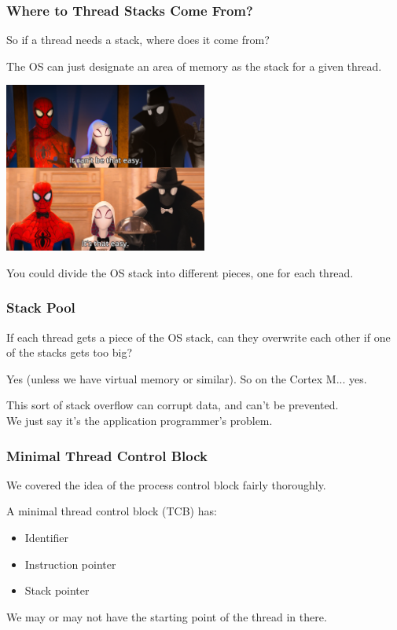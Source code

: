 \begin{frame}
\frametitle{Where to Thread Stacks Come From?}

So if a thread needs a stack, where does it come from?

The OS can just designate an area of memory as the stack for a given thread.

\begin{center}
	\includegraphics[width=0.5\textwidth]{images/thateasy.png}
\end{center}


You could divide the OS stack into different pieces, one for each thread.
\end{frame}



\begin{frame}
\frametitle{Stack Pool}

If each thread gets a piece of the OS stack, can they overwrite each other if one of the stacks gets too big?

Yes (unless we have virtual memory or similar). So on the Cortex M... yes.

This sort of stack overflow can corrupt data, and can't be prevented.\\
\quad We just say it's the application programmer's problem.

\end{frame}


\begin{frame}
\frametitle{Minimal Thread Control Block}

We covered the idea of the process control block fairly thoroughly. 

A minimal thread control block (TCB) has:

\begin{itemize}
	\item Identifier
	\item Instruction pointer
	\item Stack pointer
\end{itemize}

We may or may not have the starting point of the thread in there.

\end{frame}


